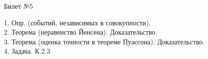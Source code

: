 \documentclass[preview]{standalone}
\begin{document}
 
\begin{center} {\Large Билет №5} \end{center} 

1.  Опр. (событий, независимых в совокупности).\\

2.  Теорема (неравенство Йенсена). Доказательство.\\

3.  Теорема (оценка точности в теореме Пуассона). Доказательство.\\

4. Задача. К.2.3\\
\end{document}
